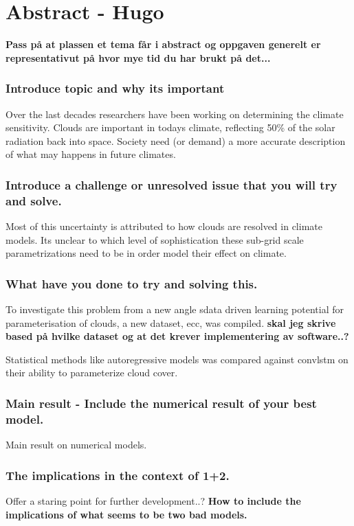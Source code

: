 \chapter*{Abstract - Hugo}
\textbf{Pass på at plassen et tema får i abstract og oppgaven generelt er representativut på hvor mye tid du har brukt på det...}

\subsection*{Introduce topic and why its important}
Over the last decades researchers have been working on determining the climate sensitivity. %
 Clouds are important in todays climate, reflecting 50\% of the solar radiation back into space. Society need (or demand) a more accurate description of what may happens in future climates.

\subsection*{Introduce a challenge or unresolved issue that you will try and solve.} Most of this uncertainty is attributed to how clouds are resolved in climate models.
Its unclear to which level of sophistication these sub-grid scale parametrizations need to be in order model their effect on climate.

\subsection*{What have you done to try and solving this.}
To investigate this problem from a new angle  sdata driven learning potential for parameterisation of clouds, a new dataset, \acrfull{ecc}, was compiled. \textbf{skal jeg skrive based på hvilke dataset og at det krever implementering av software..?}

Statistical methods like autoregressive models was compared against \acrfull{convlstm} on their ability to parameterize cloud cover.

\subsection*{Main result - Include the numerical result of your best model.}

Main result on numerical models.

\subsection*{The implications in the context of 1+2.}
Offer a staring point for further development..? \textbf{How to include the implications of what seems to be two bad models.}

\cleardoublepage